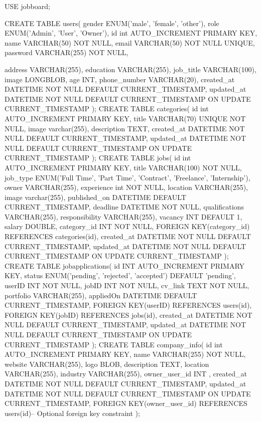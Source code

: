 USE jobboard;

CREATE TABLE users(
    gender ENUM('male', 'female', 'other'),
    role ENUM('Admin', 'User', 'Owner'),
    id int AUTO_INCREMENT PRIMARY KEY,
    name VARCHAR(50) NOT NULL,
    email VARCHAR(50) NOT NULL UNIQUE,
    password VARCHAR(255) NOT NULL,
   
    address VARCHAR(255),
    education VARCHAR(255),
    job_title VARCHAR(100),
    image LONGBLOB,
    age INT,
    phone_number VARCHAR(20),
    created_at DATETIME NOT NULL DEFAULT CURRENT_TIMESTAMP,
    updated_at DATETIME NOT NULL DEFAULT CURRENT_TIMESTAMP ON UPDATE CURRENT_TIMESTAMP
);
CREATE TABLE categories(
    id int AUTO_INCREMENT PRIMARY KEY,
    title VARCHAR(70) UNIQUE NOT NULL,
    image varchar(255),
    description TEXT,
    created_at DATETIME NOT NULL DEFAULT CURRENT_TIMESTAMP,
    updated_at DATETIME NOT NULL DEFAULT CURRENT_TIMESTAMP ON UPDATE CURRENT_TIMESTAMP
);
CREATE TABLE jobs(
    id int AUTO_INCREMENT PRIMARY KEY,
    title VARCHAR(100) NOT NULL,
    job_type ENUM('Full Time', 'Part Time', 'Contract', 'Freelance', 'Internship'),
    owner VARCHAR(255),
    experience int NOT NULL,
    location VARCHAR(255),
    image varchar(255),
    published_on DATETIME DEFAULT CURRENT_TIMESTAMP,
    deadline DATETIME NOT NULL,
    qualifications VARCHAR(255),
    responsibility VARCHAR(255),
    vacancy INT DEFAULT 1, salary DOUBLE,
    category_id INT NOT NULL,
    FOREIGN KEY(category_id) REFERENCES categories(id),
    created_at DATETIME NOT NULL DEFAULT CURRENT_TIMESTAMP,
    updated_at DATETIME NOT NULL DEFAULT CURRENT_TIMESTAMP ON UPDATE CURRENT_TIMESTAMP
);
CREATE TABLE jobapplications(
        id INT AUTO_INCREMENT PRIMARY KEY,
        status ENUM('pending', 'rejected', 'accepted') DEFAULT 'pending',
        userID INT NOT NULL,
        jobID INT NOT NULL,
        cv_link TEXT NOT NULL,
        portfolio VARCHAR(255),
        appliedOn DATETIME DEFAULT CURRENT_TIMESTAMP,
        FOREIGN KEY(userID) REFERENCES users(id),
        FOREIGN KEY(jobID) REFERENCES jobs(id),
        created_at DATETIME NOT NULL DEFAULT CURRENT_TIMESTAMP,
        updated_at DATETIME NOT NULL DEFAULT CURRENT_TIMESTAMP ON UPDATE CURRENT_TIMESTAMP
);
CREATE TABLE company_info(
        id int AUTO_INCREMENT PRIMARY KEY,
        name VARCHAR(255) NOT NULL,
        website VARCHAR(255),
        logo BLOB,
        description TEXT,
        location VARCHAR(255),
        industry VARCHAR(255),
        owner_user_id INT ,
        created_at DATETIME NOT NULL DEFAULT CURRENT_TIMESTAMP,
        updated_at DATETIME NOT NULL DEFAULT CURRENT_TIMESTAMP ON UPDATE CURRENT_TIMESTAMP,
        FOREIGN KEY(owner_user_id) REFERENCES users(id)-- Optional foreign key constraint
);
